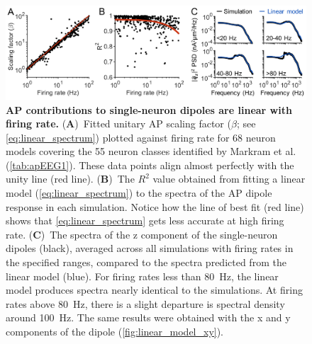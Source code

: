 \begin{figure}
	\centering
	\includegraphics[width=13.2cm]{Figures/chapter3/figure2.png}
    
    \caption[AP contributions to single-neuron dipoles are linear with firing rate]{\textbf{AP contributions to single-neuron dipoles are linear with firing rate.} (\textbf{A})~Fitted unitary AP scaling factor ($\beta$; see {\ref{eq:linear_spectrum}}) plotted against firing rate for 68 neuron models covering the 55 neuron classes identified by Markram et al. \cite{Markram2015} (\autoref{tab:apEEG1}). These data points align almost perfectly with the unity line (red line). (\textbf{B})~The $R^2$ value obtained from fitting a linear model ({\ref{eq:linear_spectrum}}) to the spectra of the AP dipole response in each simulation. Notice how the line of best fit (red line) shows that {\ref{eq:linear_spectrum}} gets less accurate at high firing rate. (\textbf{C})~The spectra of the z component of the single-neuron dipoles (black), averaged across all simulations with firing rates in the specified ranges, compared to the spectra predicted from the linear model (blue). For firing rates less than 80~\unit{\hertz}, the linear model produces spectra nearly identical to the simulations. At firing rates above 80~\unit{\hertz}, there is a slight departure is spectral density around 100~\unit{\hertz}. The same results were obtained with the x and y components of the dipole ({\autoref{fig:linear_model_xy}}).} 
    \label{fig:all_linear_model}
\end{figure}


